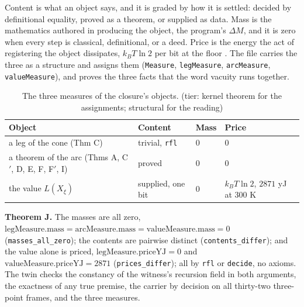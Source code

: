 \documentclass[10pt,twocolumn]{article}
\begin{document}
Content is what an object says, and it is graded by how it is settled:
decided by definitional equality, proved as a theorem, or supplied as
data. Mass is the mathematics authored in producing the object, the
program's \(\Delta M\), and it is zero when every step is classical,
definitional, or a deed. Price is the energy the act of registering the
object dissipates, \(k_B T \ln 2\) per bit at the floor
\cite{landauer1961, berut2012}. The file carries the three as a
structure and assigns them (\texttt{Measure}, \texttt{legMeasure},
\texttt{arcMeasure}, \texttt{valueMeasure}), and proves the three facts
that the word vacuity runs together.

\begin{table}[t]
\footnotesize
\caption{The three measures of the closure's objects. (tier: kernel theorem for the assignments; structural for the reading)}
\begin{tabular}{@{}p{}p{}p{}p{}@{}}
\toprule
Object & Content & Mass & Price \\
\midrule
a leg of the cone (Thm C) & trivial, \texttt{rfl} & $0$ & $0$ \\
a theorem of the arc (Thms A, C$'$, D, E, F, F$'$, I) & proved & $0$ & $0$ \\
the value $L(X_\xi)$ & supplied, one bit & $0$ & $k_B T \ln 2$, $2871$ yJ at $300$ K \\
\bottomrule
\end{tabular}
\end{table}

\textbf{Theorem J.} The masses are all zero,
\(\mathrm{legMeasure.mass} = \mathrm{arcMeasure.mass} = \mathrm{valueMeasure.mass} = 0\)
(\texttt{masses\_\allowbreak all\_\allowbreak zero}); the contents are
pairwise distinct (\texttt{contents\_\allowbreak differ}); and the value
alone is priced, \(\mathrm{legMeasure.priceYJ} = 0\) and
\(\mathrm{valueMeasure.priceYJ} = 2871\)
(\texttt{prices\_\allowbreak differ}); all by \texttt{rfl} or
\texttt{decide}, no axioms. The twin checks the constancy of the
witness's recursion field in both arguments, the exactness of any true
premise, the carrier by decision on all thirty-two three-point frames,
and the three measures.
\end{document}

